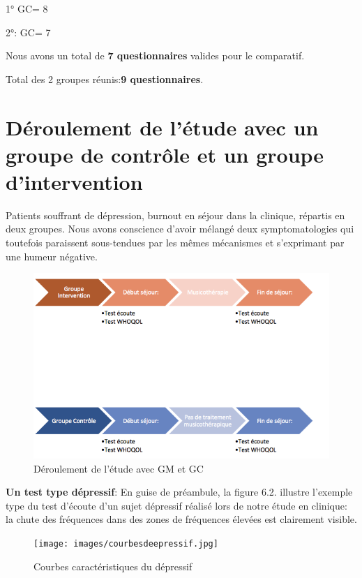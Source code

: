      1° GC= 8
     
     2°: GC= 7
     
     Nous avons un total de \textbf{7 questionnaires} valides pour le
     comparatif.
     
Total des 2 groupes réunis:\textbf{9 questionnaires}.
    
 
     
          
 
 
 	
 	
       

 	
 	\section{Déroulement de l'étude avec un groupe
          de contrôle et un groupe d'intervention}





                                      Patients souffrant de dépression, burnout
                                               en séjour dans la
                                               clinique, répartis en
                                               deux groupes.
                                               Nous avons conscience
                                               d'avoir mélangé deux
                                               symptomatologies qui
                                               toutefois paraissent
                                               sous-tendues par les
                                               mêmes mécanismes et
                                               s'exprimant par une
                                               humeur négative.

\begin{figure}
\centering
\includegraphics[width=0.7\linewidth]{images/Groupecontrole.png}
\caption[Schéma du déroulement]{Déroulement de l'étude avec GM et GC}
       
\label{groupecontroleimage1}
\end{figure}
\textbf{Un test type dépressif}: 
En guise de préambule, la figure 6.2. illustre l'exemple type du test
d'écoute d'un sujet dépressif réalisé lors de notre
étude en clinique: la
chute des fréquences dans des zones de fréquences élevées est
clairement visible.
 \begin{figure}
	\centering
	\texttt{[image: images/courbesdeepressif.jpg]}
	\caption{Courbes caractéristiques du dépressif}
	\label{fig:courbes du dépressif}
      \end{figure}




